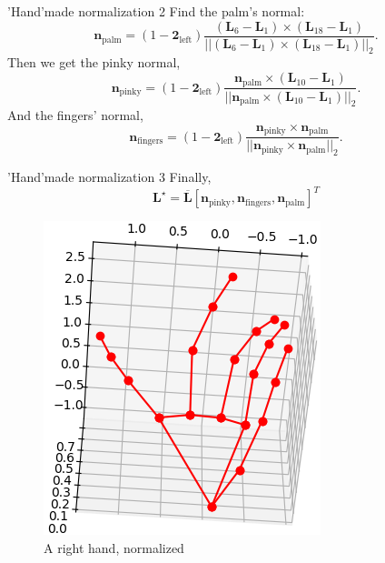 \documentclass[english]{beamer}
\begin{document}
\begin{frame}{'Hand'made normalization 2}
    Find the palm's normal:
    \begin{equation}
        \mathbf{n}_{\mathrm{palm}} = (1 - \mathbf{2}_{\textrm{left}})\frac{(\mathbf{L}_6 - \mathbf{L}_1)\times(\mathbf{L}_{18} - \mathbf{L}_1)}{||(\mathbf{L}_6 - \mathbf{L}_1)\times(\mathbf{L}_{18} - \mathbf{L}_1)||_2}.
    \end{equation}
    Then we get the pinky normal,
    \begin{equation}
        \mathbf{n}_{\mathrm{pinky}} = (1 - \mathbf{2}_{\textrm{left}})\frac{\mathbf{n}_{\mathrm{palm}}\times(\mathbf{L}_{10} - \mathbf{L}_1)}{||\mathbf{n}_{\mathrm{palm}}\times(\mathbf{L}_{10} - \mathbf{L}_1)||_2}.
    \end{equation}
    And the fingers' normal,
    \begin{equation}
        \mathbf{n}_{\mathrm{fingers}} = (1 - \mathbf{2}_{\textrm{left}})\frac{\mathbf{n}_{\mathrm{pinky}}\times \mathbf{n}_{\mathrm{palm}}}{||\mathbf{n}_{\mathrm{pinky}}\times \mathbf{n}_{\mathrm{palm}}||_2}.
    \end{equation}
\end{frame}

\begin{frame}{'Hand'made normalization 3}
    Finally, 
    \begin{equation}
        \mathbf{L}^\star = \overline{\mathbf{L}}\left[\mathbf{n}_{\mathrm{pinky}}, \mathbf{n}_{\mathrm{fingers}}, \mathbf{n}_{\mathrm{palm}}\right]^T
    \end{equation}
    \begin{figure}
        \centering
        \includegraphics[width=.4\textwidth]{images/norm_hand.png}
        \caption{A right hand, normalized}
    \end{figure}
\end{frame}
\end{document}
